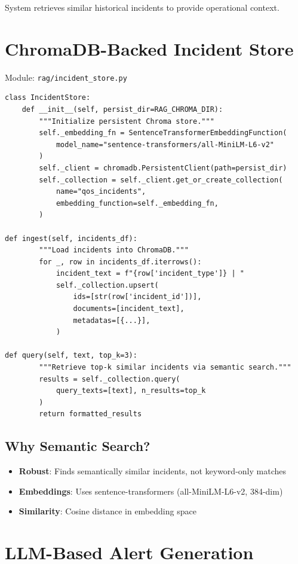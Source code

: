 \documentclass[11pt,a4paper,oneside]{report}
\begin{document}
System retrieves similar historical incidents to provide operational context.

\section{ChromaDB-Backed Incident Store}

Module: \texttt{rag/incident\_store.py}

\begin{lstlisting}
class IncidentStore:
    def __init__(self, persist_dir=RAG_CHROMA_DIR):
        """Initialize persistent Chroma store."""
        self._embedding_fn = SentenceTransformerEmbeddingFunction(
            model_name="sentence-transformers/all-MiniLM-L6-v2"
        )
        self._client = chromadb.PersistentClient(path=persist_dir)
        self._collection = self._client.get_or_create_collection(
            name="qos_incidents",
            embedding_function=self._embedding_fn,
        )

def ingest(self, incidents_df):
        """Load incidents into ChromaDB."""
        for _, row in incidents_df.iterrows():
            incident_text = f"{row['incident_type']} | "
            self._collection.upsert(
                ids=[str(row['incident_id'])],
                documents=[incident_text],
                metadatas=[{...}],
            )

def query(self, text, top_k=3):
        """Retrieve top-k similar incidents via semantic search."""
        results = self._collection.query(
            query_texts=[text], n_results=top_k
        )
        return formatted_results
\end{lstlisting}

\subsection{Why Semantic Search?}

\begin{itemize}
    \item \textbf{Robust}: Finds semantically similar incidents, not keyword-only matches
    \item \textbf{Embeddings}: Uses sentence-transformers (all-MiniLM-L6-v2, 384-dim)
    \item \textbf{Similarity}: Cosine distance in embedding space
\end{itemize}

\section{LLM-Based Alert Generation}
\end{document}
